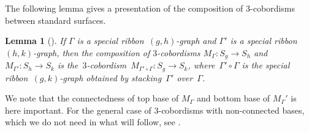 \documentclass[pdftex]{sigma}
\numberwithin{equation}{section}
\newtheorem{Lemma}[Theorem]{Lemma}
\newcommand{\co}{\colon}
\newcommand{\RomanNumeralCaps}[1]
{\MakeUppercase{\romannumeral #1}}
\begin{document}
The following lemma gives a presentation of the composition of 3-cobordisms between standard surfaces.
\begin{Lemma}[{\cite[Section~\RomanNumeralCaps{4}.2.3]{turaevqinvariants}}]\label{naivecompo}
If $\Gamma$ is a special ribbon~$(g,h)$-graph and $\Gamma'$ is a special ribbon~$(h,k)$-graph, then the composition of $3$-cobordisms $M_\Gamma \co S_g \to S_h$ and $M_{\Gamma'} \co S_{h} \to S_{k}$ is the~$3$-cobordism~$M_{\Gamma'\circ \Gamma} \co S_{g} \to S_{k}$, where~$\Gamma'\circ \Gamma$ is the special ribbon~$(g,k)$-graph obtained by stacking~$\Gamma'$ over~$\Gamma$.
\end{Lemma}
We note that the connectedness of top base of $M_\Gamma$ and bottom base of $M_\Gamma'$ is here important. For the general case of $3$-cobordisms with non-connected bases, which we do not need in what will follow, see \cite[Section~IV.2.8]{turaevqinvariants}.
\end{document}
